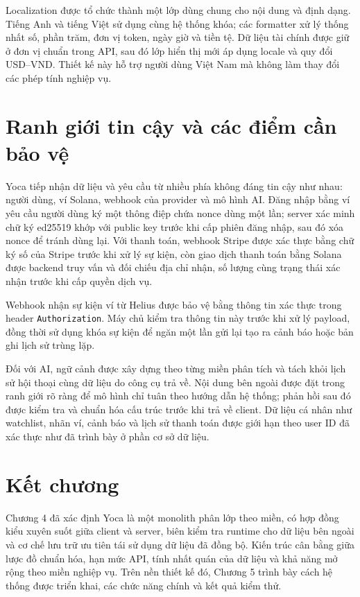 Localization được tổ chức thành một lớp dùng chung cho nội dung và định dạng. Tiếng Anh và tiếng Việt sử dụng cùng hệ thống khóa; các formatter xử lý thống nhất số, phần trăm, đơn vị token, ngày giờ và tiền tệ. Dữ liệu tài chính được giữ ở đơn vị chuẩn trong API, sau đó lớp hiển thị mới áp dụng locale và quy đổi USD--VND. Thiết kế này hỗ trợ người dùng Việt Nam mà không làm thay đổi các phép tính nghiệp vụ.

\section{Ranh giới tin cậy và các điểm cần bảo vệ}

Yoca tiếp nhận dữ liệu và yêu cầu từ nhiều phía không đáng tin cậy như nhau: người dùng, ví Solana, webhook của provider và mô hình AI. Đăng nhập bằng ví yêu cầu người dùng ký một thông điệp chứa nonce dùng một lần; server xác minh chữ ký ed25519 khớp với public key trước khi cấp phiên đăng nhập, sau đó xóa nonce để tránh dùng lại. Với thanh toán, webhook Stripe được xác thực bằng chữ ký số của Stripe trước khi xử lý sự kiện, còn giao dịch thanh toán bằng Solana được backend truy vấn và đối chiếu địa chỉ nhận, số lượng cùng trạng thái xác nhận trước khi cấp quyền dịch vụ.

Webhook nhận sự kiện ví từ Helius được bảo vệ bằng thông tin xác thực trong header \texttt{Authorization}. Máy chủ kiểm tra thông tin này trước khi xử lý payload, đồng thời sử dụng khóa sự kiện để ngăn một lần gửi lại tạo ra cảnh báo hoặc bản ghi lịch sử trùng lặp.

Đối với AI, ngữ cảnh được xây dựng theo từng miền phân tích và tách khỏi lịch sử hội thoại cùng dữ liệu do công cụ trả về. Nội dung bên ngoài được đặt trong ranh giới rõ ràng để mô hình chỉ tuân theo hướng dẫn hệ thống; phản hồi sau đó được kiểm tra và chuẩn hóa cấu trúc trước khi trả về client. Dữ liệu cá nhân như watchlist, nhãn ví, cảnh báo và lịch sử thanh toán được giới hạn theo user ID đã xác thực như đã trình bày ở phần cơ sở dữ liệu.

\section{Kết chương}

Chương 4 đã xác định Yoca là một monolith phân lớp theo miền, có hợp đồng kiểu xuyên suốt giữa client và server, biên kiểm tra runtime cho dữ liệu bên ngoài và cơ chế lưu trữ ưu tiên tái sử dụng dữ liệu đã đồng bộ. Kiến trúc cân bằng giữa lược đồ chuẩn hóa, hạn mức API, tính nhất quán của dữ liệu và khả năng mở rộng theo miền nghiệp vụ. Trên nền thiết kế đó, Chương 5 trình bày cách hệ thống được triển khai, các chức năng chính và kết quả kiểm thử.
